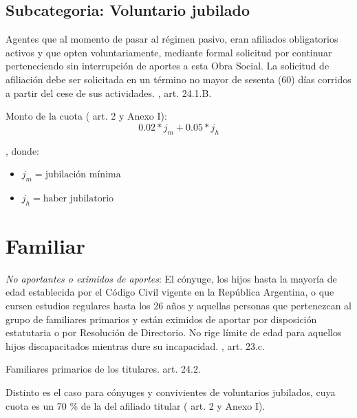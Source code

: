 \subsection{Subcategoria: Voluntario jubilado}
\begin{displayquote}
Agentes que al momento de pasar al régimen pasivo, eran afiliados obligatorios activos y
que opten voluntariamente, mediante formal solicitud por continuar perteneciendo sin
interrupción de aportes a esta Obra Social. La solicitud de afiliación debe ser solicitada en
un término no mayor de sesenta (60) días corridos a partir del cese de sus actividades. \hfill\parencite{dospuOrd53}, art. 24.1.B. 
\end{displayquote}

Monto de la cuota (\cite{dospuRes21} art. 2 y Anexo I): $$0.02 * j_m + 0.05 * j_h$$

, donde:
\begin{itemize}
    \item $j_m = \text{jubilación mínima}$
    \item $j_h = \text{haber jubilatorio}$
\end{itemize}

\section{Familiar} \label{sec:familiar}
\begin{displayquote}
\emph{No aportantes o eximidos de aportes}: El cónyuge, los hijos hasta la mayoría de edad establecida por el Código Civil vigente en la República Argentina, o que cursen estudios regulares hasta los 26 años y aquellas personas que pertenezcan al grupo de familiares primarios y están eximidos de aportar por disposición estatutaria o por Resolución de Directorio. No rige límite de edad para aquellos hijos discapacitados mientras dure su incapacidad.
\hfill\parencite{dospuOrd53}, art. 23.c.
\end{displayquote}

\begin{displayquote}
Familiares primarios de los titulares.
\hfill\parencite{dospuOrd53} art. 24.2.
\end{displayquote}

Distinto es el caso para cónyuges y convivientes de voluntarios jubilados, cuya cuota es un 70 \% de la del afiliado titular (\cite{dospuRes21} art. 2 y Anexo I).


